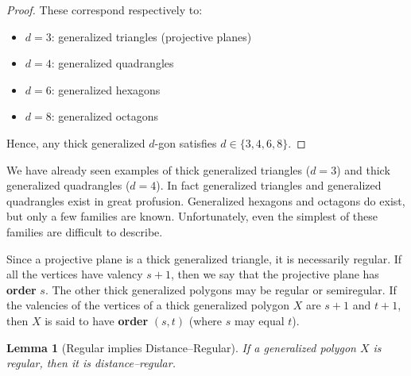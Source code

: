 \documentclass[12pt,a4paper,openany]{book}
\newtheorem{lemma}{Lemma}[section]
\begin{document}
\begin{proof}
\noindent
These correspond respectively to:
\begin{itemize}
    \item $d=3$: generalized triangles (projective planes)
    \item $d=4$: generalized quadrangles
    \item $d=6$: generalized hexagons
    \item $d=8$: generalized octagons
\end{itemize}

Hence, any thick generalized $d$-gon satisfies $d \in \{3,4,6,8\}$.
\end{proof}

We have already seen examples of thick generalized triangles ($d = 3$) and thick generalized quadrangles ($d = 4$). In fact generalized triangles and generalized quadrangles exist in great profusion. Generalized hexagons and octagons do exist, but only a few families are known. Unfortunately, even the simplest of these families are difficult to describe.

Since a projective plane is a thick generalized triangle, it is necessarily regular. If all the vertices have valency $s + 1$, then we say that the projective plane has \textbf{order} $s$. The other thick generalized polygons may be regular or semiregular. If the valencies of the vertices of a thick generalized polygon $X$ are $s + 1$ and $t + 1$, then $X$ is said to have \textbf{order} $(s, t)$ (where $s$ may equal $t$).

\begin{lemma}[Regular implies Distance–Regular]\label{lem:regular-to-dr}
If a generalized polygon $X$ is regular, then it is distance–regular.
\end{lemma}
\end{document}
